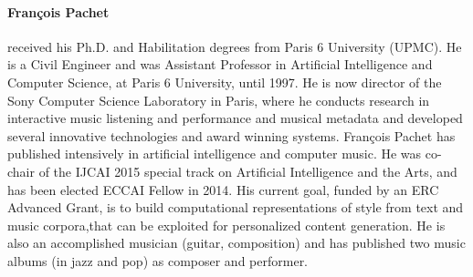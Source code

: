 {\paragraph{François Pachet} received his Ph.D. and Habilitation degrees from Paris 6 University (UPMC). He is a Civil Engineer and was Assistant Professor in Artificial Intelligence and Computer Science, at Paris 6 University, until 1997. He is now director of the Sony Computer Science Laboratory in Paris, where he conducts research in interactive music listening and performance and musical metadata and developed several innovative technologies and award winning systems. François Pachet has published intensively in artificial intelligence and computer music. He was co-chair of the IJCAI 2015 special track on Artificial Intelligence and the Arts, and has been elected ECCAI Fellow in 2014. His current goal, funded by an ERC Advanced Grant, is to build computational representations of style from text and music corpora,that can be exploited for personalized content generation. He is also an accomplished musician (guitar, composition) and has published two music albums (in jazz and pop) as composer and performer.}

